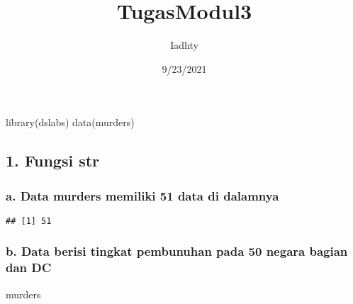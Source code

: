 \documentclass[
]{article}
\title{TugasModul3}
\author{Iadhty}
\date{9/23/2021}
\newenvironment{Shaded}{\begin{snugshade}}{\end{snugshade}}
\newcommand{\FunctionTok}[1]{\textcolor[rgb]{0.00,0.00,0.00}{#1}}
\newcommand{\NormalTok}[1]{#1}
\newcommand{\SpecialCharTok}[1]{\textcolor[rgb]{0.00,0.00,0.00}{#1}}
\begin{document}
\maketitle

\begin{Shaded}
\begin{Highlighting}[]
\FunctionTok{library}\NormalTok{(dslabs)}
\FunctionTok{data}\NormalTok{(murders)}
\end{Highlighting}
\end{Shaded}

\hypertarget{fungsi-str}{%
\subsection{1. Fungsi str}\label{fungsi-str}}

\hypertarget{a.-data-murders-memiliki-51-data-di-dalamnya}{%
\subsubsection{a. Data murders memiliki 51 data di
dalamnya}\label{a.-data-murders-memiliki-51-data-di-dalamnya}}

\begin{Shaded}
\end{Shaded}

\begin{verbatim}
## [1] 51
\end{verbatim}

\hypertarget{b.-data-berisi-tingkat-pembunuhan-pada-50-negara-bagian-dan-dc}{%
\subsubsection{b. Data berisi tingkat pembunuhan pada 50 negara bagian
dan
DC}\label{b.-data-berisi-tingkat-pembunuhan-pada-50-negara-bagian-dan-dc}}

\begin{Shaded}
\begin{Highlighting}[]
\NormalTok{murders}
\end{Highlighting}
\end{Shaded}
\end{document}
